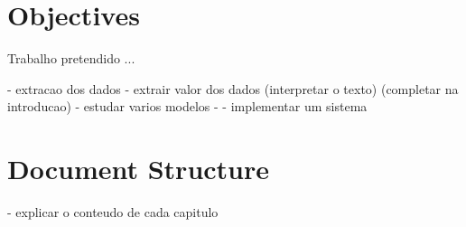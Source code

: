 \section{Objectives}
\label{sec:objectives}

Trabalho pretendido ... 

- extracao dos dados 
- extrair valor dos dados (interpretar o texto) (completar na introducao)
- estudar varios modelos 
- 
- implementar um sistema 


\section{Document Structure}
\label{sec:doc_structure}

- explicar o conteudo de cada capitulo 